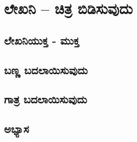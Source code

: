 \chapter{ಲೇಖನಿ – ಚಿತ್ರ ಬಿಡಿಸುವುದು}

\section{ಲೇಖನಿಯುಕ್ತ - ಮುಕ್ತ}
\SampleProgram
\section{ಬಣ್ಣ ಬದಲಾಯಿಸುವುದು}

\section{ಗಾತ್ರ ಬದಲಾಯಿಸುವುದು}

\section{ಅಭ್ಯಾಸ }